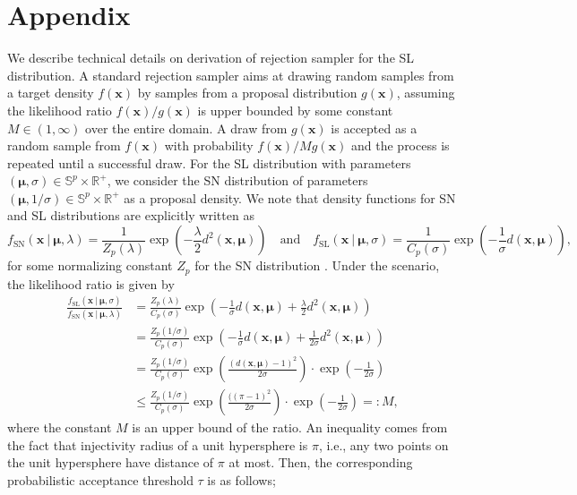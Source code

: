\documentclass[10pt]{article}
\newcommand{\bfx}{\mathbf{x}}
\newcommand{\bfmu}{\boldsymbol{\mu}}
\newcommand{\bbS}{\mathbb{S}}
\newcommand{\bbRpos}{\mathbb{R}^+}
\newcommand{\fSN}{f_{\textrm{SN}}}
\newcommand{\fSL}{f_{\textrm{SL}}}
\begin{document}
\section*{Appendix}\label{sec:appendix}
We describe technical details on derivation of rejection sampler for the SL distribution. A standard rejection sampler aims at drawing random samples from a target density $f(\bfx)$ by samples from a proposal distribution $g(\bfx)$, assuming the likelihood ratio $f(\bfx)/g(\bfx)$ is upper bounded by some constant $M \in (1, \infty)$ over the entire domain. A draw from $g(\bfx)$ is accepted as a random sample from $f(\bfx)$ with probability $f(\bfx)/M g(\bfx)$ and the process is repeated until a successful draw. For the SL distribution with parameters $(\bfmu,\sigma) \in \bbS^p \times \bbRpos$, we consider the SN distribution of parameters $(\bfmu, 1/\sigma) \in \bbS^p \times \bbRpos$ as a proposal density. We note that density functions for SN and SL distributions are explicitly written as
\begin{equation*}
\fSN(\bfx~|~\bfmu,\lambda) = \frac{1}{Z_p(\lambda)} \exp \left(-\frac{\lambda}{2} d^2(\bfx,\bfmu)\right)\quad\text{and}\quad \fSL(\bfx~|~\bfmu,\sigma) = \frac{1}{C_p(\sigma)} \exp \left(-\frac{1}{\sigma} d(\bfx,\bfmu)\right),
\end{equation*}
for some normalizing constant $Z_p$ for the SN distribution \cite{hauberg_2018_DirectionalStatisticsSpherical}. Under the scenario, the likelihood ratio is given by
\begin{align*}
\frac{\fSL(\bfx~|~\bfmu,\sigma)}{\fSN(\bfx~|~\bfmu,\lambda)} &= 
\frac{Z_p (\lambda)}{C_p (\sigma)} \exp\left(-\frac{1}{\sigma}d(\bfx,\bfmu) + \frac{\lambda}{2} d^2(\bfx,\bfmu)\right)\\ 
&=
\frac{Z_p (1/\sigma)}{C_p (\sigma)} \exp\left(-\frac{1}{\sigma}d(\bfx,\bfmu) + \frac{1}{2\sigma} d^2(\bfx,\bfmu)\right)\\
&= \frac{Z_p (1/\sigma)}{C_p (\sigma)} \exp\left(\frac{(d(\bfx,\bfmu)-1)^2}{2\sigma}\right) \cdot  \exp\left(-\frac{1}{2\sigma}\right)\\  &\leq \frac{Z_p (1/\sigma)}{C_p (\sigma)} \exp\left(\frac{((\pi-1)^2}{2\sigma}\right) \cdot \exp\left(-\frac{1}{2\sigma}\right) =: M,
\end{align*}
where the constant $M$ is an upper bound of the ratio. An inequality comes from the fact that injectivity radius of a unit hypersphere is $\pi$, i.e., any two points on the unit hypersphere have distance of $\pi$ at most. Then, the corresponding probabilistic acceptance threshold $\tau$ is as follows;
\end{document}
